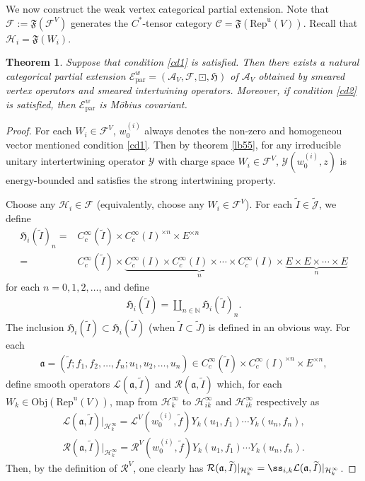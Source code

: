 \documentclass[11pt,b5paper,notitlepage]{article}
\theoremstyle{definition}
\theoremstyle{plain}
\newtheorem{thm}[df]{Theorem}
\newcommand{\fk}{\mathfrak}
\newcommand{\mc}{\mathcal}
\newcommand{\wtd}{\widetilde}
\newcommand{\loc}{\mathrm{par}}
\newcommand{\scr}{\mathscr}
\newcommand{\Jtd}{\widetilde{\mathcal J}}
\newcommand{\RepuV}{\mathrm{Rep}^{\mathrm u}(V)}
\newcommand{\mbb}{\mathbb}
\newcommand{\Obj}{\mathrm{Obj}}
\numberwithin{equation}{subsection}
\begin{document}
We now construct the weak vertex categorical partial extension. Note that $\mc F:=\fk F(\mc F^V)$ generates the $C^*$-tensor category $\scr C=\fk F(\RepuV)$. Recall that $\mc H_i=\fk F(W_i)$.

\begin{thm}
Suppose that condition \ref{cd1} is satisfied. Then there exists a natural categorical partial extension $\scr E^w_\loc=(\mc A_V,\mc F,\boxdot,\fk H)$ of $\mc A_V$ obtained by smeared vertex operators and smeared intertwining operators. Moreover, if condition \ref{cd2} is satisfied, then $\scr E^w_\loc$ is M\"obius covariant.
\end{thm}


\begin{proof}
For each $W_i\in\mc F^V$, $w^{(i)}_0$ always denotes the non-zero and homogeneou vector mentioned condition \ref{cd1}. Then by theorem \ref{lb55}, for any irreducible unitary intertertwining operator $\mc Y$ with charge space $W_i\in\mc F^V$, $\mc Y(w^{(i)}_0,z)$ is energy-bounded and satisfies the strong intertwining property. 

Choose any $\mc H_i\in\mc F$ (equivalently, choose any $W_i\in\mc F^V$). For each $\wtd I\in\Jtd$, we define
\begin{align}
\fk H_i(\wtd I)_n=&C_c^\infty(\wtd I)\times C_c^\infty(I)^{\times n}\times E^{\times n}\nonumber\\
=&C_c^\infty(\wtd I)\times\underbrace{C_c^\infty(I)\times C_c^\infty(I)\times\cdots\times C_c^\infty(I)}_{n}\times\underbrace{E\times E\times\cdots\times E}_{n} 
\end{align}
for each $n=0,1,2,\dots$, and define 
\begin{align}
\fk H_i(\wtd I)=\coprod_{n\in\mbb N}\fk H_i(\wtd I)_n.
\end{align}
The inclusion $\fk H_i(\wtd I)\subset \fk H_i(\wtd J)$ (when $\wtd I\subset\wtd J$) is defined in an obvious way. For each
\begin{align*}
\fk a=(\wtd f;f_1,f_2,\dots,f_n;u_1,u_2,\dots,u_n)\in C_c^\infty(\wtd I)\times C_c^\infty(I)^{\times n}\times E ^{\times n},
\end{align*}
define smooth operators $\mc L(\fk a,\wtd I)$ and $\mc R(\fk a,\wtd I)$ which, for each $W_k\in\Obj(\RepuV)$, map from $\mc H_k^\infty$ to $\mc H_{ik}^\infty$ and $\mc H_{ik}^\infty$ respectively as
\begin{gather}
\mc L(\fk a,\wtd I)|_{\mc H_k^\infty}=\mc L^V(w^{(i)}_0,\wtd f)Y_k(u_1,f_1)\cdots Y_k(u_n,f_n),\label{eq40}\\
\mc R(\fk a,\wtd I)|_{\mc H_k^\infty}=\mc R^V(w^{(i)}_0,\wtd f)Y_k(u_1, f_1)\cdots Y_k(u_n,f_n).\label{eq41}
\end{gather}
Then, by the definition of $\mc R^V$, one clearly has $\mc R(\fk a,\wtd I)|_{\mc H_k^\infty}=\ss_{i,k}\mc L(\fk a,\wtd I)|_{\mc H_k^\infty}$. 


\end{proof}
\end{document}
